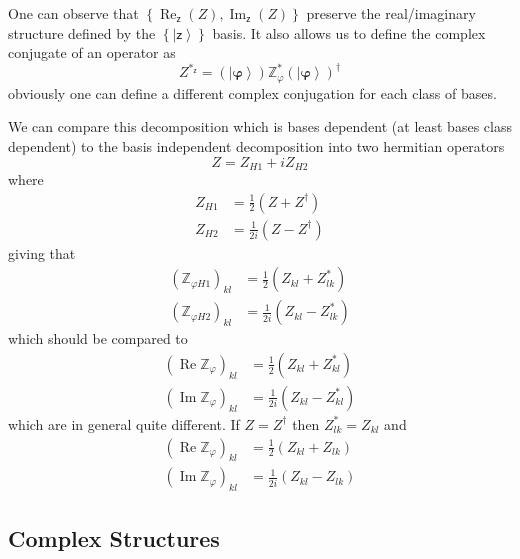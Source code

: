 \documentclass[aps,preprint]{revtex4}%
\begin{document}
One can observe that $\left\{  \operatorname{Re}_{\mathsf{z}}\left(  Z\right)
,\operatorname{Im}_{\mathsf{z}}\left(  Z\right)  \right\}  $ preserve the
real/imaginary structure defined by the $\left\{  \left\vert \mathsf{z}%
\right\rangle \right\}  $ basis. It also allows us to define the complex
conjugate of an operator as
\begin{equation}
Z^{\ast_{\mathsf{z}}}=\left(  \left\vert \mathbf{\varphi}\right\rangle
\right)  \mathbb{Z}_{\varphi}^{\ast}\left(  \left\vert \mathbf{\varphi
}\right\rangle \right)  ^{\dagger}%
\end{equation}
obviously one can define a different complex conjugation for each class of bases.

We can compare this decomposition which is bases dependent (at least bases
class dependent) to the basis independent decomposition into two hermitian
operators
\begin{equation}
Z=Z_{H1}+iZ_{H2}%
\end{equation}
where
\begin{align}
Z_{H1} &  =\frac{1}{2}\left(  Z+Z^{\dagger}\right)  \nonumber\\
Z_{H2} &  =\frac{1}{2i}\left(  Z-Z^{\dagger}\right)
\end{align}
giving that
\begin{align}
\left(  \mathbb{Z}_{\varphi H1}\right)  _{kl} &  =\frac{1}{2}\left(
Z_{kl}+Z_{lk}^{\ast}\right)  \nonumber\\
\left(  \mathbb{Z}_{\varphi H2}\right)  _{kl} &  =\frac{1}{2i}\left(
Z_{kl}-Z_{lk}^{\ast}\right)
\end{align}
which should be compared to
\begin{align}
\left(  \operatorname{Re}\mathbb{Z}_{\varphi}\right)  _{kl} &  =\frac{1}%
{2}\left(  Z_{kl}+Z_{kl}^{\ast}\right)  \nonumber\\
\left(  \operatorname{Im}\mathbb{Z}_{\varphi}\right)  _{kl} &  =\frac{1}%
{2i}\left(  Z_{kl}-Z_{kl}^{\ast}\right)
\end{align}
which are in general quite different. If $Z=Z^{\dagger}$ then $Z_{lk}^{\ast
}=Z_{kl}$ and
\begin{align}
\left(  \operatorname{Re}\mathbb{Z}_{\varphi}\right)  _{kl}  & =\frac{1}%
{2}\left(  Z_{kl}+Z_{lk}\right)  \nonumber\\
\left(  \operatorname{Im}\mathbb{Z}_{\varphi}\right)  _{kl}  & =\frac{1}%
{2i}\left(  Z_{kl}-Z_{lk}\right)
\end{align}


\subsection{Complex Structures}
\end{document}
